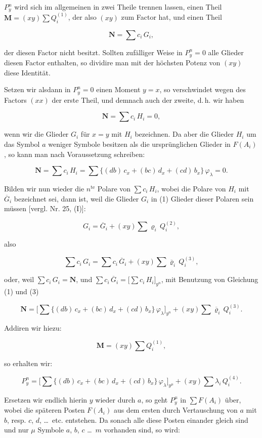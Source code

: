 \documentclass[11pt]{article}
\providecommand{\weberpage}[1]{}
\providecommand{\weq}[2]{\begin{equation}\tag{#1}#2\end{equation}}
\begin{document}
$P_y^n$ wird sich im allgemeinen in zwei Theile trennen lassen, einen
Theil $\mathbf{M} = (xy) \sum Q_i^{(1)}$, der also $(xy)$ zum Factor hat, und einen
Theil

\weq{1}{\mathbf{N} = \sum c_i\,G_i,}

der diesen Factor nicht besitzt. Sollten zufälliger Weise in $P_y^n = 0$
alle Glieder diesen Factor enthalten, so dividire man mit der höchsten
Potenz von $(xy)$ diese Identität.

Setzen wir alsdann in $P_y^n = 0$ einen Moment $y = x$, so verschwindet
wegen des Factors $(xx)$ der erste Theil, und demnach auch der zweite,
d.\,h. wir haben

\weq{2}{\mathbf{N} = \sum c_i\,H_i = 0,}

wenn wir die Glieder $G_i$ für $x = y$ mit $H_i$ bezeichnen. Da aber die
Glieder $H_i$ um das Symbol $a$ weniger Symbole besitzen als die ursprünglichen
Glieder in $F(A_i)$, so kann man nach Voraussetzung schreiben:

\weq{3}{\mathbf{N} = \sum c_i\,H_i = \sum \{(db)\,c_x + (bc)\,d_x + (cd)\,b_x\}\,\varphi_\lambda = 0.}

Bilden wir nun wieder die $n^{\text{te}}$ Polare von $\sum c_i\,H_i$, wobei die
Polare von $H_i$ mit $\overline{G}_i$ bezeichnet sei, dann ist, weil die Glieder $G_i$
in (1) Glieder dieser Polaren sein müssen [vergl. Nr. 25, (I)]:

\[
G_i = \overline{G}_i + (xy) \sum \varrho_i\,Q_i^{(2)},
\]

also

\[
\sum c_i\,G_i = \sum c_i\,\overline{G}_i + (xy) \sum \overline{\varrho}_i\,Q_i^{(3)},
\]

oder, weil $\sum c_i\,G_i = \mathbf{N}$, und $\sum c_i\,\overline{G}_i = \big[\sum c_i\,H_i\big]_{y^n}$,
mit Benutzung von Gleichung (1) und (3)

\[
\mathbf{N} = \Big[\sum \{(db)\,c_x + (bc)\,d_x + (cd)\,b_x\}\,\varphi_\lambda\Big]_{y^n} + (xy) \sum \overline{\varrho}_i\,Q_i^{(3)}.
\]


\weberpage{134}
Addiren wir hiezu:

\[
\mathbf{M} = (xy) \sum Q_i^{(1)},
\]

so erhalten wir:

\[
P_y^n = \Big[\sum \{(db)\,c_x + (bc)\,d_x + (cd)\,b_x\}\,\varphi_\lambda\Big]_{y^\mu} + (xy) \sum \lambda_i\,Q_i^{(4)}.
\]

Ersetzen wir endlich hierin $y$ wieder durch $a$, so geht $P_y^\mu$ in
$\sum F(A_i)$ über, wobei die späteren Posten $F(A_i)$ aus dem ersten durch
Vertauschung von $a$ mit $b$, resp. $c$, $d$, \dots\ etc. entstehen. Da sonach
alle diese Posten einander gleich sind und nur $\mu$ Symbole $a$, $b$, $c$ \dots\
$m$ vorhanden sind, so wird:
\end{document}
